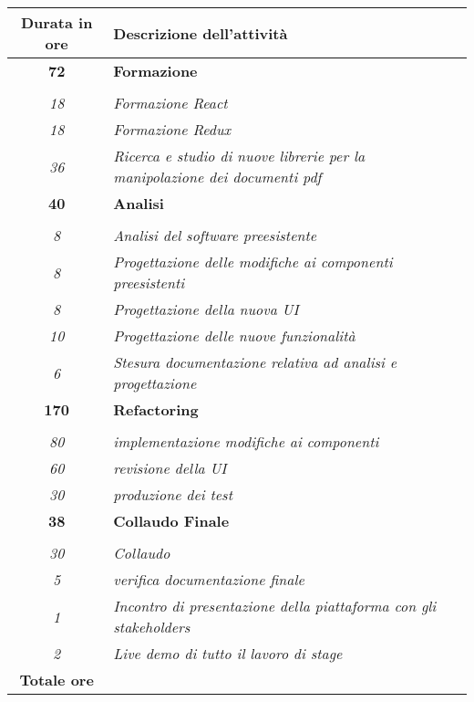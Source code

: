 

\begin{tabularx}{\textwidth}{|c|X|}
	\hline
	\textbf{Durata in ore} & \textbf{Descrizione dell'attività} \\\hline
	
	\textbf{72} & \textbf{Formazione} \\ \hdashline 
    \multirow{3}{0cm}\\ 
    \textit{18} & 
    \textit{Formazione React} \\
    \textit{18} & 
    \textit{Formazione Redux} \\
    \textit{36} & 
    \textit{Ricerca e studio di nuove librerie per la manipolazione dei documenti pdf} \\
    \hline

    \textbf{40} & \textbf{Analisi} \\ \hdashline 
    \multirow{3}{0cm}\\ 
    \textit{8} & 
    \textit{Analisi del software preesistente} \\
    \textit{8} & 
    \textit{Progettazione delle modifiche ai componenti preesistenti} \\
    \textit{8} & 
    \textit{Progettazione della nuova UI} \\
    \textit{10} & 
    \textit{Progettazione delle nuove funzionalità} \\
    \textit{6} & 
    \textit{Stesura documentazione relativa ad analisi e progettazione} \\
    \hline

    \textbf{170} & \textbf{Refactoring} \\ \hdashline 
    \multirow{3}{0cm}\\ 
    \textit{80} & 
    \textit{implementazione modifiche ai componenti} \\
    \textit{60} & 
    \textit{revisione della UI} \\
    \textit{30} & 
    \textit{produzione dei test} \\
    \hline
    
    \textbf{38} & \textbf{Collaudo Finale}  \\ \hdashline 
    \multirow{4}{0cm}\\ 
    \textit{30} & 
    \textit{Collaudo} \\
    \textit{5} & 
    \textit{verifica documentazione finale} \\
    \textit{1} & 
    \textit{Incontro di presentazione della piattaforma con gli stakeholders} \\
    \textit{2} & 
    \textit{Live demo di tutto il lavoro di stage} \\
    \hline
	
	\textbf{Totale ore} & \multicolumn{1}{|c|}{\textbf{\totaleOre}} \\\hline
	
	
\end{tabularx}